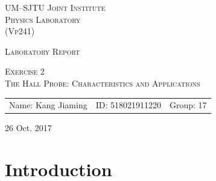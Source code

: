 \documentclass{article}
\begin{document}
\vspace*{0.4cm}

\hrulefill %

\thispagestyle{empty} %

\begin{center}
\begin{large}
\scshape{UM--SJTU Joint Institute \vspace{0.3em} \\ Physics Laboratory \\(Vp241)}
\end{large}

\hrulefill %

\vspace*{7.5cm}
\begin{Large}
\scshape{{Laboratory Report}}
\end{Large}

\vspace{2.5em}

\begin{large}
\scshape{Exercise 2}\\
\vspace{0.5em}
\scshape{The Hall Probe: Characteristics and Applications}
\end{large}
\end{center}

\vspace{13em}

\begin{table}[h!]
\center
\begin{tabular}{lll}
Name: Kang Jiaming \hspace*{2em}&
ID: 518021911220\hspace*{2em}
& Group: 17\\
\end{tabular}
\end{table}

\vspace{-0.4cm}

\begin{center}
\hspace{0.3em} 26 Oct. 2017
\end{center}

\newpage
\tableofcontents
\setcounter{page}{0}
\thispagestyle{empty}
\newpage



		\section{Introduction}
\end{document}

